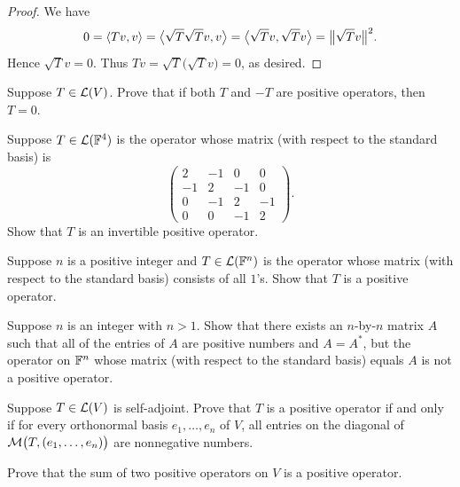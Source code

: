 \begin{proof}
We have
\[ 0=\langle Tv, v \rangle=\bigl\langle\sqrt{T}\sqrt{T}v,v\bigr\rangle
   =\bigl\langle\sqrt{T}v,\sqrt{T}v\bigr\rangle=\bigl\lVert\sqrt{T}v\bigr\rVert^2. \]
Hence $\sqrt{T}v=0$. Thus $Tv=\sqrt{T}\bigl(\sqrt{T}v\bigr)=0$, as desired.
\end{proof}

\begin{exc}

\begin{exercise}
Suppose $T\in\mathcal{L}(V)$. Prove that if both $T$ and $-T$ are positive operators,
then $T=0$.
\end{exercise}

\begin{exercise}
Suppose $T\in\mathcal{L}(\mathbb{F}^4)$ is the operator whose matrix (with respect to the
standard basis) is
\[ \begin{pmatrix}2&-1&0&0\\-1&2&-1&0\\0&-1&2&-1\\0&0&-1&2\end{pmatrix}. \]
Show that $T$ is an invertible positive operator.
\end{exercise}

\begin{exercise}
Suppose $n$ is a positive integer and $T\in\mathcal{L}(\mathbb{F}^n)$ is the operator whose
matrix (with respect to the standard basis) consists of all $1$'s. Show that $T$
is a positive operator.
\end{exercise}

\begin{exercise}
Suppose $n$ is an integer with $n>1$. Show that there exists an $n$-by-$n$
matrix $A$ such that all of the entries of $A$ are positive numbers and
$A=A^*$, but the operator on $\mathbb{F}^n$ whose matrix (with respect to the standard
basis) equals $A$ is not a positive operator.
\end{exercise}

\begin{exercise}
Suppose $T\in\mathcal{L}(V)$ is self-adjoint. Prove that $T$ is a positive operator if
and only if for every orthonormal basis $e_1,\dots,e_n$ of $V$, all entries on
the diagonal of $\mathcal{M}\bigl(T,(e_1,\dots,e_n)\bigr)$ are nonnegative numbers.
\end{exercise}

\begin{exercise}
Prove that the sum of two positive operators on $V$ is a positive operator.
\end{exercise}


\end{exc}

